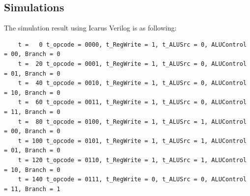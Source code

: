 \documentclass{article}
\begin{document}
\subsection{Simulations}
The simulation result using Icarus Verilog is as following:
\begin{Verbatim}
    t =   0 t_opcode = 0000, t_RegWrite = 1, t_ALUSrc = 0, ALUControl = 00, Branch = 0
    t =  20 t_opcode = 0001, t_RegWrite = 1, t_ALUSrc = 0, ALUControl = 01, Branch = 0
    t =  40 t_opcode = 0010, t_RegWrite = 1, t_ALUSrc = 0, ALUControl = 10, Branch = 0
    t =  60 t_opcode = 0011, t_RegWrite = 1, t_ALUSrc = 0, ALUControl = 11, Branch = 0
    t =  80 t_opcode = 0100, t_RegWrite = 1, t_ALUSrc = 1, ALUControl = 00, Branch = 0
    t = 100 t_opcode = 0101, t_RegWrite = 1, t_ALUSrc = 1, ALUControl = 01, Branch = 0
    t = 120 t_opcode = 0110, t_RegWrite = 1, t_ALUSrc = 1, ALUControl = 10, Branch = 0
    t = 140 t_opcode = 0111, t_RegWrite = 0, t_ALUSrc = 0, ALUControl = 11, Branch = 1
\end{Verbatim}
\end{document}
